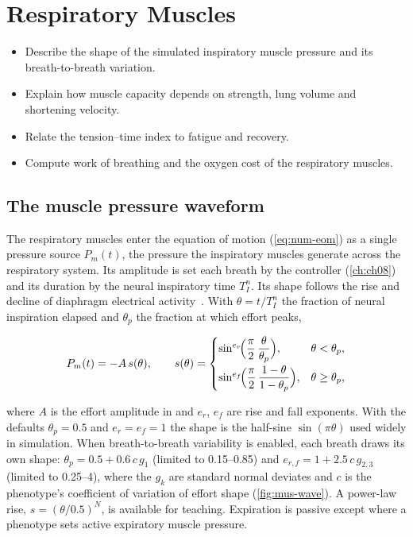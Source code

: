 \chapter{Respiratory Muscles}
\label{ch:ch07}

\begin{objectives}
\begin{itemize}[leftmargin=*]
  \item Describe the shape of the simulated inspiratory muscle pressure and its breath-to-breath variation.
  \item Explain how muscle capacity depends on strength, lung volume and shortening velocity.
  \item Relate the tension--time index to fatigue and recovery.
  \item Compute work of breathing and the oxygen cost of the respiratory muscles.
\end{itemize}
\end{objectives}

\section{The muscle pressure waveform}
\label{sec:mus-wave}
The respiratory muscles enter the equation of motion (\cref{eq:num-eom}) as a single pressure source $P_m(t)$, the pressure the inspiratory muscles generate across the respiratory system. Its amplitude is set each breath by the controller (\cref{ch:ch08}) and its duration by the neural inspiratory time $T_I^{n}$. Its shape follows the rise and decline of diaphragm electrical activity~\citep{roussos1982}. With $\theta = t/T_I^{n}$ the fraction of neural inspiration elapsed and $\theta_p$ the fraction at which effort peaks,
\begin{keyequation}
\begin{equation}
P_m(t) = -A\,s(\theta),\qquad
s(\theta)=\begin{cases}
\sin^{e_r}\!\Bigl(\dfrac{\pi}{2}\,\dfrac{\theta}{\theta_p}\Bigr), & \theta<\theta_p,\\[8pt]
\sin^{e_f}\!\Bigl(\dfrac{\pi}{2}\,\dfrac{1-\theta}{1-\theta_p}\Bigr), & \theta\ge\theta_p,
\end{cases}
\label{eq:mus-wave}
\end{equation}
\end{keyequation}
where $A$ is the effort amplitude in \si{\cmH} and $e_r$, $e_f$ are rise and fall exponents. With the defaults $\theta_p = 0.5$ and $e_r = e_f = 1$ the shape is the half-sine $\sin(\pi\theta)$ used widely in simulation. When breath-to-breath variability is enabled, each breath draws its own shape: $\theta_p = 0.5 + 0.6\,c\,g_1$ (limited to 0.15--0.85) and $e_{r,f} = 1 + 2.5\,c\,g_{2,3}$ (limited to 0.25--4), where the $g_k$ are standard normal deviates and $c$ is the phenotype's coefficient of variation of effort shape (\cref{fig:mus-wave}). A power-law rise, $s = (\theta/0.5)^{N}$, is available for teaching. Expiration is passive except where a phenotype sets active expiratory muscle pressure.

